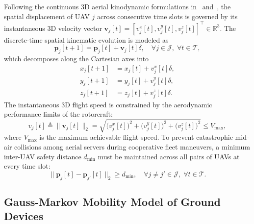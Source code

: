\documentclass[journal]{IEEEtran}
\begin{document}
Following the continuous 3D aerial kinodynamic formulations in~\cite{li2026tnse} and~\cite{8937764}, the spatial displacement of UAV $j$ across consecutive time slots is governed by its instantaneous 3D velocity vector $\mathbf{v}_j[t] = [v_j^x[t], v_j^y[t], v_j^z[t]]^\top \in \mathbb{R}^3$. The discrete-time spatial kinematic evolution is modeled as
\begin{equation}
    \mathbf{p}_j[t+1] = \mathbf{p}_j[t] + \mathbf{v}_j[t] \delta, \quad \forall j \in \mathcal{J}, \; \forall t \in \mathcal{T},
    \label{eq:uav_pos_update}
\end{equation}
which decomposes along the Cartesian axes into
\begin{align}
    x_j[t+1] &= x_j[t] + v_j^x[t] \delta, \label{eq:uav_pos_x}\\
    y_j[t+1] &= y_j[t] + v_j^y[t] \delta, \label{eq:uav_pos_y}\\
    z_j[t+1] &= z_j[t] + v_j^z[t] \delta. \label{eq:uav_pos_z}
\end{align}
The instantaneous 3D flight speed is constrained by the aerodynamic performance limits of the rotorcraft:
\begin{equation}
    v_j[t] \triangleq \|\mathbf{v}_j[t]\|_2 = \sqrt{\bigl(v_j^x[t]\bigr)^2 + \bigl(v_j^y[t]\bigr)^2 + \bigl(v_j^z[t]\bigr)^2} \le V_{\max},
    \label{eq:uav_max_speed}
\end{equation}
where $V_{\max}$ is the maximum achievable flight speed. To prevent catastrophic mid-air collisions among aerial servers during cooperative fleet maneuvers, a minimum inter-UAV safety distance $d_{\min}$ must be maintained across all pairs of UAVs at every time slot:
\begin{equation}
    \|\mathbf{p}_j[t] - \mathbf{p}_{j'}[t]\|_2 \ge d_{\min}, \quad \forall j \neq j' \in \mathcal{J}, \; \forall t \in \mathcal{T}.
    \label{eq:collision_avoidance_dist}
\end{equation}

\subsection{Gauss-Markov Mobility Model of Ground Devices}
\end{document}
